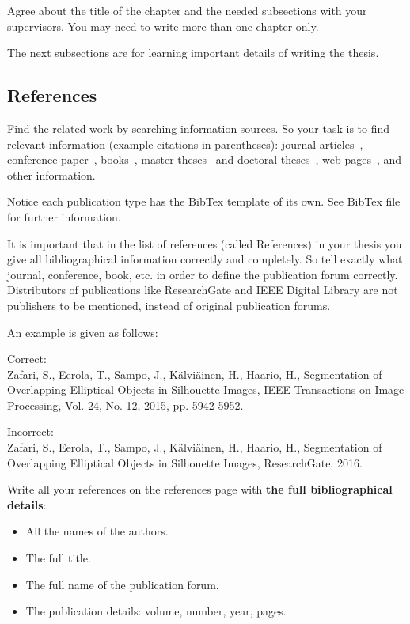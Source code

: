 \documentclass{lutmscthesis}[2017/10/03]
\begin{document}
Agree about the title of the chapter and the needed subsections with your supervisors. 
You may need to write more than one chapter only. 

The next subsections are for learning important details of writing the thesis. 

\subsection{References}

Find the related work by searching information sources. 
So your task is to find relevant information (example citations in parentheses): 
journal articles~\cite{hamouz2005feature}, 
conference paper~\cite{zafari2017comparison}, 
books~\cite{GonWoo:2002}, 
master theses~\cite{Lyubanenko2017MScThesis} and doctoral theses~\cite{strokina2013phdthesis}, 
web pages~\cite{lutstudyportal}, 
and other information.

Notice each publication type has the BibTex template of its own. See BibTex file for further information. 

It is important that in the list of references (called References) in your thesis you give all bibliographical information correctly and completely. So tell exactly what journal, conference, book, etc. in order to define the publication forum correctly. Distributors of publications like ResearchGate and IEEE Digital Library are not publishers to be mentioned, instead of original publication forums.

An example is given as follows:

Correct:\\
Zafari, S., Eerola, T., Sampo, J., Kälviäinen, H., Haario, H., Segmentation of Overlapping Elliptical Objects in Silhouette Images, IEEE Transactions on Image Processing, Vol. 24, No. 12, 2015, pp. 5942-5952.

Incorrect:\\
Zafari, S., Eerola, T., Sampo, J., Kälviäinen, H., Haario, H., Segmentation of Overlapping Elliptical Objects in Silhouette Images, ResearchGate, 2016. 

Write all your references on the references page with {\bf the full bibliographical details}: 
\vspace{-18pt}
\begin{itemize}
\itemsep=-4pt
\item All the names of the authors. 
\item The full title.
\item The full name of the publication forum. 
\item The publication details: volume, number, year, pages. 
\end{itemize}
\end{document}
